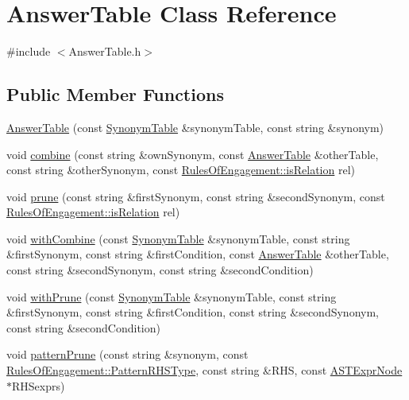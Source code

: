 \hypertarget{class_answer_table}{\section{Answer\-Table Class Reference}
\label{class_answer_table}
}


{\ttfamily \#include $<$Answer\-Table.\-h$>$}

\subsection*{Public Member Functions}
\begin{DoxyCompactItemize}
\item 
\hyperlink{class_answer_table_a01b3a71cd50d9ebd513068463650c34f}{Answer\-Table} (const \hyperlink{class_synonym_table}{Synonym\-Table} \&synonym\-Table, const string \&synonym)
\item 
void \hyperlink{class_answer_table_ac5da4ad26b82eca376998313ada78da0}{combine} (const string \&own\-Synonym, const \hyperlink{class_answer_table}{Answer\-Table} \&other\-Table, const string \&other\-Synonym, const \hyperlink{class_rules_of_engagement_aad838c0ef69d7c4ee9bef23a431ff6c1}{Rules\-Of\-Engagement\-::is\-Relation} rel)
\item 
void \hyperlink{class_answer_table_a5c3bbb34b61b0dc49edcf62c817c994a}{prune} (const string \&first\-Synonym, const string \&second\-Synonym, const \hyperlink{class_rules_of_engagement_aad838c0ef69d7c4ee9bef23a431ff6c1}{Rules\-Of\-Engagement\-::is\-Relation} rel)
\item 
void \hyperlink{class_answer_table_affa20cce217db5e4618490224c32ad22}{with\-Combine} (const \hyperlink{class_synonym_table}{Synonym\-Table} \&synonym\-Table, const string \&first\-Synonym, const string \&first\-Condition, const \hyperlink{class_answer_table}{Answer\-Table} \&other\-Table, const string \&second\-Synonym, const string \&second\-Condition)
\item 
void \hyperlink{class_answer_table_af420ffab72e6f473cd09f577aac7e518}{with\-Prune} (const \hyperlink{class_synonym_table}{Synonym\-Table} \&synonym\-Table, const string \&first\-Synonym, const string \&first\-Condition, const string \&second\-Synonym, const string \&second\-Condition)
\item 
void \hyperlink{class_answer_table_a476cd4e95ee3dcd392d6d9bb66240cc5}{pattern\-Prune} (const string \&synonym, const \hyperlink{class_rules_of_engagement_a97613ded2253a252de010070d7c54ac1}{Rules\-Of\-Engagement\-::\-Pattern\-R\-H\-S\-Type}, const string \&R\-H\-S, const \hyperlink{class_a_s_t_expr_node}{A\-S\-T\-Expr\-Node} $\ast$R\-H\-Sexprs)

\end{DoxyCompactItemize}
